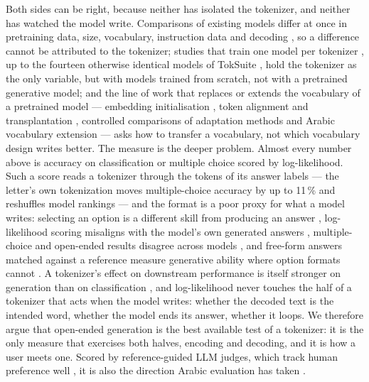 Both sides can be right, because neither has isolated the tokenizer, and neither has watched the model write.
Comparisons of existing models differ at once in pretraining data, size, vocabulary, instruction data and decoding
\citep{alakeel2026morphemes,reda2026yallamorph}, so a difference cannot be attributed to the tokenizer; studies that
train one model per tokenizer
\citep{alyafeai-2023-tokenizers,toraman-2023-tokenization,alrefaie2024exploring,asgari-2026-morphbpe}, up to the
fourteen otherwise identical models of TokSuite \citep{altintas-2025-toksuite}, hold the tokenizer as the only variable,
but with models trained from scratch, not with a pretrained generative model; and the line of work that replaces or
extends the vocabulary of a pretrained model --- embedding initialisation
\citep{minixhofer-etal-2022-wechsel,dobler-de-melo-2023-focus,mundra2024empirical}, token alignment and transplantation
\citep{li-2025-tokalign,goddard-2025-omp}, controlled comparisons of adaptation methods
\citep{andriushchenko-2025-tokenizer-russian} and Arabic vocabulary extension
\citep{bari-2025-allam,zhu-2025-arallama,kashirskiy-2025-aratoken} --- asks how to transfer a vocabulary, not which
vocabulary design writes better. The measure is the deeper problem. Almost every number above is accuracy on
classification or multiple choice scored by log-likelihood. Such a score reads a tokenizer through the tokens of its
answer labels --- the letter's own tokenization moves multiple-choice accuracy by up to 11\,\% and reshuffles model
rankings \citep{zheng2024large,sanz-guerrero-2025-mindthegap} --- and the format is a poor proxy for what a model
writes: selecting an option is a different skill from producing an answer \citep{balepur-2025-mcqa}, log-likelihood
scoring misaligns with the model's own generated answers \citep{lyu-2024-beyondprobabilities}, multiple-choice and
open-ended results disagree across models \citep{wei-2024-rethinking}, and free-form answers matched against a reference
measure generative ability where option formats cannot \citep{myrzakhan-2024-openllm,chandak-2025-answermatching}. A
tokenizer's effect on downstream performance is itself stronger on generation than on classification
\citep{goldman-2024-unpacking}, and log-likelihood never touches the half of a tokenizer that acts when the model
writes: whether the decoded text is the intended word, whether the model ends its answer, whether it loops. We therefore
argue that open-ended generation is the best available test of a tokenizer: it is the only measure that exercises both
halves, encoding and decoding, and it is how a user meets one. Scored by reference-guided LLM judges, which track human
preference well \citep{zheng2023judging}, it is also the direction Arabic evaluation has taken
\citep{elfilali-2024-aragen}.

